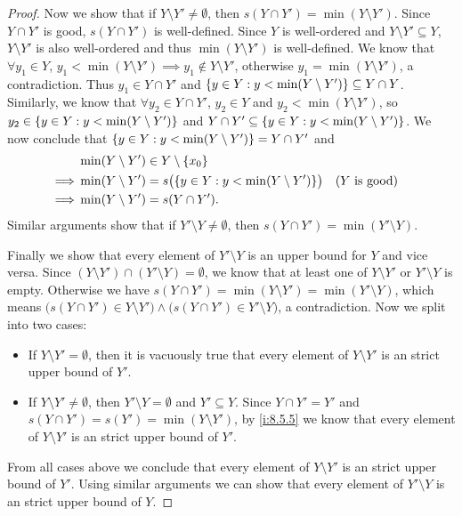 \begin{proof}
  Now we show that if \(Y \setminus Y' \neq \emptyset\), then \(s(Y \cap Y') = \min(Y \setminus Y')\).
  Since \(Y \cap Y'\) is good, \(s(Y \cap Y')\) is well-defined.
  Since \(Y\) is well-ordered and \(Y \setminus Y' \subseteq Y\), \(Y \setminus Y'\) is also well-ordered and thus \(\min(Y \setminus Y')\) is well-defined.
  We know that \(\forall y_1 \in Y\), \(y_1 < \min(Y \setminus Y') \implies y_1 \notin Y \setminus Y'\), otherwise \(y_1 = \min(Y \setminus Y')\), a contradiction.
  Thus \(y_1 \in Y \cap Y'\) and \(\left\lbrace y \in Y : y < \min(Y \setminus Y')\right\rbrace \subseteq Y \cap Y\).
  Similarly, we know that \(\forall y_2 \in Y \cap Y'\), \(y_2 \in Y\) and \(y_2 < \min(Y \setminus Y')\), so \(y_2 \in \left\lbrace y \in Y : y < \min(Y \setminus Y')\right\rbrace\) and \(Y \cap Y' \subseteq \left\lbrace y \in Y : y < \min(Y \setminus Y')\right\rbrace\).
  We now conclude that \(\left\lbrace y \in Y : y < \min(Y \setminus Y')\right\rbrace = Y \cap Y'\) and
  \begin{align*}
             & \min(Y \setminus Y') \in Y \setminus \set{x_0}                                                         \\
    \implies & \min(Y \setminus Y') = s\big(\set{y \in Y : y < \min(Y \setminus Y')}\big) &  & \text{(\(Y\) is good)} \\
    \implies & \min(Y \setminus Y') = s(Y \cap Y').
  \end{align*}
  Similar arguments show that if \(Y' \setminus Y \neq \emptyset\), then \(s(Y \cap Y') = \min(Y' \setminus Y)\).

  Finally we show that every element of \(Y' \setminus Y\) is an upper bound for \(Y\) and vice versa.
  Since \((Y \setminus Y') \cap (Y' \setminus Y) = \emptyset\), we know that at least one of \(Y \setminus Y'\) or \(Y' \setminus Y\) is empty.
  Otherwise we have \(s(Y \cap Y') = \min(Y \setminus Y') = \min(Y' \setminus Y)\), which means \(\big(s(Y \cap Y') \in Y \setminus Y'\big) \land \big(s(Y \cap Y') \in Y' \setminus Y\big)\), a contradiction.
  Now we split into two cases:
  \begin{itemize}
    \item If \(Y \setminus Y' = \emptyset\), then it is vacuously true that every element of \(Y \setminus Y'\) is an strict upper bound of \(Y'\).
    \item If \(Y \setminus Y' \neq \emptyset\), then \(Y' \setminus Y = \emptyset\) and \(Y' \subseteq Y\).
          Since \(Y \cap Y' = Y'\) and \(s(Y \cap Y') = s(Y') = \min(Y \setminus Y')\), by \cref{i:8.5.5} we know that every element of \(Y \setminus Y'\) is an strict upper bound of \(Y'\).
  \end{itemize}
  From all cases above we conclude that every element of \(Y \setminus Y'\) is an strict upper bound of \(Y'\).
  Using similar arguments we can show that every element of \(Y' \setminus Y\) is an strict upper bound of \(Y\).
\end{proof}

